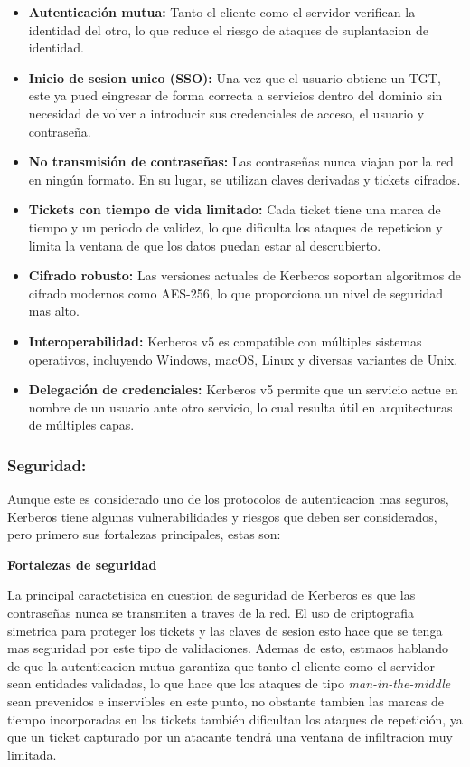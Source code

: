 \documentclass[letterpaper,12pt]{article}
\begin{document}
\begin{itemize}[leftmargin=2cm]
  \item \textbf{Autenticaci\'on mutua:} Tanto el cliente como el servidor verifican la identidad del otro, lo que reduce el 
  riesgo de ataques de suplantacion de identidad.
  \item \textbf{Inicio de sesion unico (SSO):} Una vez que el usuario obtiene un TGT, 
  este ya pued eingresar de forma correcta a servicios dentro del dominio sin necesidad de volver a introducir 
  sus credenciales de acceso, el usuario y contraseña.
  \item \textbf{No transmisi\'on de contrase\~nas:} Las contrase\~nas nunca viajan por la red en ning\'un formato.
  En su lugar, se utilizan claves derivadas y tickets cifrados.
  \item \textbf{Tickets con tiempo de vida limitado:} Cada ticket tiene una marca de tiempo y un periodo de 
  validez, lo que dificulta los ataques de repeticion y limita la ventana de que los datos puedan estar al descrubierto.
  \item \textbf{Cifrado robusto:} Las versiones actuales de Kerberos soportan algoritmos de 
  cifrado modernos como AES-256, lo que proporciona un nivel de seguridad mas alto.
  \item \textbf{Interoperabilidad:} Kerberos v5 es compatible con m\'ultiples sistemas operativos, 
  incluyendo Windows, macOS, Linux y diversas variantes de Unix.
  \item \textbf{Delegaci\'on de credenciales:} Kerberos v5 permite que un servicio actue en nombre de un 
  usuario ante otro servicio, lo cual resulta \'util en arquitecturas de m\'ultiples capas.
\end{itemize}

\newpage

\subsubsection{Seguridad:}

Aunque este es considerado uno de los protocolos de autenticacion mas seguros,
Kerberos tiene algunas vulnerabilidades y riesgos que deben ser considerados, pero primero sus fortalezas principales, estas son:

\textbf{Fortalezas de seguridad}

La principal caractetisica en cuestion de seguridad de Kerberos es que las contrase\~nas nunca 
se transmiten a traves de la red. 
El uso de criptografia simetrica para proteger los tickets y las claves de sesion esto hace que se tenga mas seguridad
por este tipo de validaciones. Ademas de esto, estmaos hablando de que la autenticacion mutua garantiza 
que tanto el cliente como el servidor sean entidades validadas, lo que hace que los ataques de tipo 
\textit{man-in-the-middle} sean prevenidos e inservibles en este punto, no obstante tambien las marcas de
tiempo incorporadas en los tickets tambi\'en dificultan los ataques de repetici\'on, ya que un ticket 
capturado por un atacante tendr\'a una ventana de infiltracion muy limitada.
\end{document}

